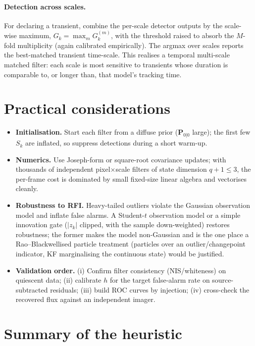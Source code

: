 \documentclass[11pt]{article}
\begin{document}
\paragraph{Detection across scales.}
For declaring a transient, combine the per-scale detector outputs by the scale-wise
maximum, $G_k=\max_m G_k^{(m)}$, with the threshold raised to absorb the $M$-fold
multiplicity (again calibrated empirically). The argmax over scales reports the
best-matched transient time-scale. This realises a temporal multi-scale matched
filter: each scale is most sensitive to transients whose duration is comparable to,
or longer than, that model's tracking time.

\section{Practical considerations}

\begin{itemize}[leftmargin=*]
  \item \textbf{Initialisation.} Start each filter from a diffuse prior
  ($\bm{P}_{0|0}$ large); the first few $S_k$ are inflated, so suppress detections
  during a short warm-up.
  \item \textbf{Numerics.} Use Joseph-form or square-root covariance updates; with
  thousands of independent pixel$\times$scale filters of state dimension $q{+}1\le3$,
  the per-frame cost is dominated by small fixed-size linear algebra and vectorises
  cleanly.
  \item \textbf{Robustness to RFI.} Heavy-tailed outliers violate the Gaussian
  observation model and inflate false alarms. A Student-$t$ observation model or a
  simple innovation gate ($|z_k|$ clipped, with the sample down-weighted) restores
  robustness; the former makes the model non-Gaussian and is the one place a
  Rao--Blackwellised particle treatment (particles over an outlier/changepoint
  indicator, KF marginalising the continuous state) would be justified.
  \item \textbf{Validation order.} (i) Confirm filter consistency (NIS/whiteness) on
  quiescent data; (ii) calibrate $h$ for the target false-alarm rate on
  source-subtracted residuals; (iii) build ROC curves by injection; (iv) cross-check
  the recovered flux against an independent imager.
\end{itemize}

\section{Summary of the heuristic}
\end{document}
